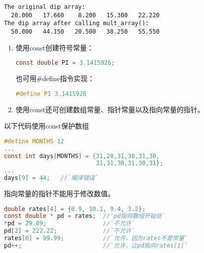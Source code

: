 \begin{frame}[fragile]
\begin{lstlisting}[backgroundcolor=\color{red!20}]
The original dip array:
  20.000   17.660    8.200   15.300   22.220 
The dip array after calling mult_array():
  50.000   44.150   20.500   38.250   55.550 
\end{lstlisting}  
\end{frame}

\begin{frame}[fragile]
\begin{enumerate}
\item 使用{\tf const}创建符号常量：
\begin{lstlisting}[language=c,backgroundcolor=\color{red!20}]
const double PI = 3.1415926; 
\end{lstlisting}
也可用{\tf \#define}指令实现：
\begin{lstlisting}[language=c,backgroundcolor=\color{red!20}]
#define PI 3.1415926
\end{lstlisting}
\end{enumerate}
\end{frame}

\begin{frame}[fragile]
\begin{enumerate}\setcounter{enumi}{1}
\item 使用{\tf const}还可创建数组常量、指针常量以及指向常量的指针。
\end{enumerate}
\end{frame}

\begin{frame}[fragile]
以下代码使用{\tf const}保护数组
\begin{lstlisting}[language=c,backgroundcolor=\color{red!20}]
#define MONTHS 12
...
const int days[MONTHS] = {31,28,31,30,31,30,
                          31,31,30,31,30,31}; 
...
days[9] = 44;   //`编译错误`
\end{lstlisting}
\end{frame}

\begin{frame}[fragile]
指向常量的指针不能用于修改数值。
\begin{lstlisting}[language=c,backgroundcolor=\color{red!20}]
double rates[4] = {8.9, 10.1, 9.4, 3.2};
const double * pd = rates;  //`pd指向数组开始处`
*pd = 29.89;                //`不允许`
pd[2] = 222.22;             //`不允许`
rates[0] = 99.99;           //`允许，因为rates不是常量`
pd++;                       //`允许，让pd指向rates[1]`
\end{lstlisting} 
\end{frame}

